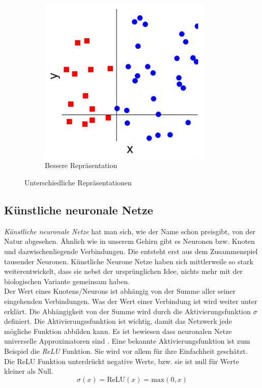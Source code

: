 \begin{figure}[hbt]
\begin{subfigure}{0.3\textwidth}
	\end{subfigure}
	\begin{subfigure}{0.3\textwidth}
		\includegraphics[width=0.9\textwidth]{assets/repr_2.png}
		\caption{Bessere Repräsentation}
	\end{subfigure}
	\caption{Unterschiedliche Repräsentationen}
	\label{img:repr}
\end{figure}

\subsection{Künstliche neuronale Netze}

\textit{Künstliche neuronale Netze} hat man sich, wie der Name schon preisgibt, von der Natur abgesehen. Ähnlich wie in unserem Gehirn gibt es Neuronen bzw. Knoten und dazwischenliegende Verbindungen. Die  entsteht erst aus dem Zusammenspiel tausender Neuronen. Künstliche Neurone Netze haben sich mittlerweile so stark weiterentwickelt, dass sie nebst der ursprünglichen Idee, nichts mehr mit der biologischen Variante gemeinsam haben. \\

Der Wert eines Knotens/Neurons ist abhängig von der Summe aller seiner eingehenden Verbindungen. Was der Wert einer Verbindung ist wird weiter unter erklärt. Die Abhängigkeit von der Summe wird durch die Aktivierungsfunktion $\sigma$ definiert. Die Aktivierungssfunktion ist wichtig, damit das Netzwerk jede mögliche Funktion abbilden kann. Es ist bewiesen dass neuronalen Netze universelle Approximatoren sind \parencite[][Kap. 4]{universal}. Eine bekannte Aktivierungsfunktion ist zum Beispiel die \textit{ReLU} Funktion. Sie wird vor allem für ihre Einfachheit geschätzt. Die ReLU Funktion unterdrückt negative Werte, bzw. sie ist null für Werte kleiner als Null. \parencite[vgl.][]{neuronale_netze}  \parencite[vgl.][]{chollet}
$$\sigma(x) = \text{ReLU}(x) = \text{max}(0, x)$$

